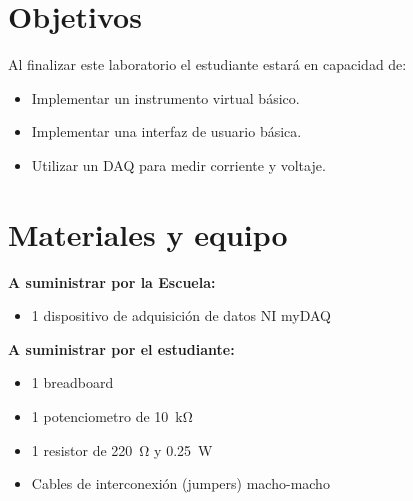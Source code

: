 \documentclass[12pt,letterpaper]{report}
\newcommand{\obj}{Objetivos}
\newcommand{\mat}{Materiales y equipo}
\newcommand{\capacidad}{Al finalizar este laboratorio el estudiante estará en capacidad de:}
\begin{document}
\section{\obj}
\capacidad
\begin{itemize}
\item Implementar un instrumento virtual básico.
\item Implementar una interfaz de usuario básica.
\item Utilizar un DAQ para medir corriente y voltaje.
\end{itemize}

\section{\mat}
\textbf{A suministrar por la Escuela:}
\begin{itemize}
\item 1 dispositivo de adquisición de datos NI myDAQ

\end{itemize}
\textbf{A suministrar por el estudiante:}
\begin{itemize}
\item 1 breadboard
\item 1 potenciometro de \SI{10}{\kilo\ohm}
\item 1 resistor de \SI{220}{\ohm} y \SI{0.25}{\watt}
\item Cables de interconexión (jumpers) macho-macho
\end{itemize}
\end{document}
